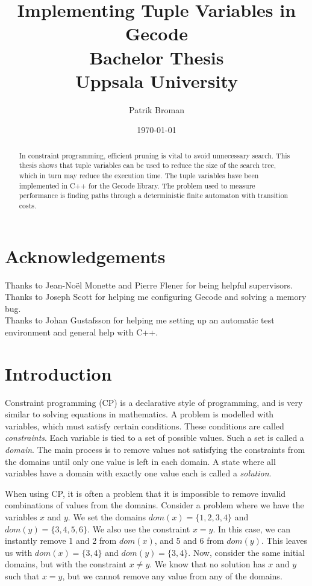 \documentclass[a4paper,11pt]{article}
\title{\textbf{Implementing Tuple Variables in Gecode\\
	Bachelor Thesis \\
    Uppsala University  \\
  }
}
\author{Patrik Broman}
\date{\today}
\begin{document}
\maketitle
{}

\begin{abstract}

In constraint programming, efficient pruning is vital to avoid unnecessary search. This thesis shows that tuple variables can be used to reduce the size of the search tree, which in turn may reduce the execution time. The tuple variables have been implemented in C++ for the Gecode library. The problem used to measure performance is finding paths through a deterministic finite automaton with transition costs.

\end{abstract}

\setcounter{tocdepth}{2}
\tableofcontents
\pagestyle{plain}

\section*{Acknowledgements}
Thanks to Jean-No\"{e}l Monette and Pierre Flener for being helpful supervisors. \\
Thanks to Joseph Scott for helping me configuring Gecode and solving a memory bug. \\
Thanks to Johan Gustafsson for helping me setting up an automatic test environment and general help with C++. \\

\section{Introduction}
Constraint programming (CP) is a declarative style of programming, and is very similar to solving equations in mathematics. A problem is modelled with variables, which must satisfy certain conditions. These conditions are called \textit{constraints}. Each variable is tied to a set of possible values. Such a set is called a \textit{domain}. The main process is to remove values not satisfying the constraints from the domains until only one value is left in each domain. A state where all variables have a domain with exactly one value each is called a \textit{solution}.

When using CP, it is often a problem that it is impossible to remove invalid combinations of values from the domains. Consider a problem where we have the variables $x$ and $y$. We set the domains $\mathit{dom}(x)=\{1,2,3,4\}$ and $\mathit{dom}(y)=\{3,4,5,6\}$. We also use the constraint $x=y$. In this case, we can instantly remove 1 and 2 from $\mathit{dom}(x)$, and 5 and 6 from $\mathit{dom}(y)$. This leaves us with $\mathit{dom}(x)=\{3,4\}$ and $\mathit{dom}(y)=\{3,4\}$. Now, consider the same initial domains, but with the constraint $x\neq y$. We know that no solution has $x$ and $y$ such that $x=y$, but we cannot remove any value from any of the domains. 
\end{document}
